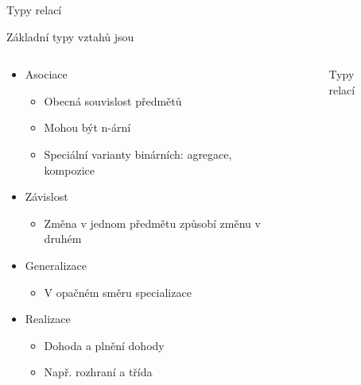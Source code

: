 \begin{frame}{Typy relací}

\onslide<+-> Základní typy vztahů jsou

\begin{columns}[T]

	\begin{column}{0.7\textwidth}
		\begin{itemize}
			\item<+-> Asociace
			\onslide<+->
			\begin{itemize}
				\item Obecná souvislost předmětů
				\item Mohou být n-ární
				\item Speciální varianty binárních: agregace, kompozice
			\end{itemize}
			
			\item<+-> Závislost
			\begin{itemize}
				\item Změna v jednom předmětu způsobí změnu v druhém
			\end{itemize}
			
			\item<+-> Generalizace
			\onslide<+->
			\begin{itemize}
				\item V opačném směru specializace
			\end{itemize}
			
			\item<+-> Realizace
			\onslide<+->
			\begin{itemize}
				\item Dohoda a plnění dohody
				\item Např. rozhraní a třída
			\end{itemize}
		\end{itemize}
	\end{column}

	\begin{column}{0.3\textwidth}
		\begin{flushleft}
		\begin{figure}
			\caption{Typy relací}
		\end{figure}
		\end{flushleft}
	\end{column}

\end{columns}	

\end{frame}

